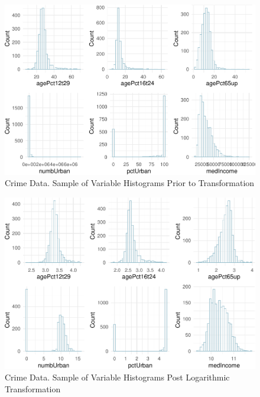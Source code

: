 \documentclass[
  11pt,
]{article}
\begin{document}
\begin{figure}[H]

{\centering \includegraphics[width=0.85\linewidth]{dissertation_files/figure-latex/Histograms df Plot-1} 

}

\caption{Crime Data. Sample of Variable Histograms Prior to Transformation}\label{fig:Histograms df Plot}
\end{figure}

\begin{figure}[H]

{\centering \includegraphics[width=0.85\linewidth]{dissertation_files/figure-latex/Histograms df_t Plot-1} 

}

\caption{Crime Data. Sample of Variable Histograms Post Logarithmic Transformation}\label{fig:Histograms df_t Plot}
\end{figure}
\end{document}
